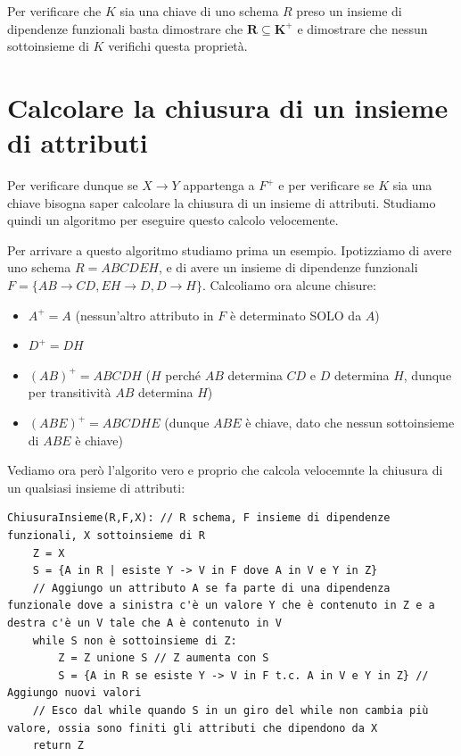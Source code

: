 \documentclass[11pt, a4paper, titlepage, oneside]{scrbook}
\begin{document}
\begin{Proposizione}
\label{propos-verificare-chiave}
Per verificare che $K$ sia una chiave di uno schema $R$ preso un insieme di dipendenze funzionali basta dimostrare che $\bm{R \subseteq K^+}$ e dimostrare che nessun sottoinsieme di $K$ verifichi questa proprietà.
\end{Proposizione} 

\section{Calcolare la chiusura di un insieme di attributi}

Per verificare dunque se $X \longrightarrow Y$ appartenga a $F^+$ e per verificare se $K$ sia una chiave bisogna saper calcolare la chiusura di un insieme di attributi. Studiamo quindi un algoritmo per eseguire questo calcolo velocemente.

Per arrivare a questo algoritmo studiamo prima un esempio. Ipotizziamo di avere uno schema $R = ABCDEH$, e di avere un insieme di dipendenze funzionali \mbox{$F = \{AB \longrightarrow CD, EH \longrightarrow D, D \longrightarrow H\}$}. Calcoliamo ora alcune chisure:
\begin{itemize}
    \item $A^+ = A$ (nessun'altro attributo in $F$ è determinato SOLO da $A$)
    \item $D^+ = DH$
    \item $(AB)^+ = ABCDH$ ($H$ perché $AB$ determina $CD$ e $D$ determina $H$, dunque per transitività $AB$ determina $H$)
    \item $(ABE)^+ = ABCDHE$ (dunque $ABE$ è chiave, dato che nessun sottoinsieme di $ABE$ è chiave)
\end{itemize} 

Vediamo ora però l'algorito vero e proprio che calcola velocemnte la chiusura di un qualsiasi insieme di attributi:
\begin{lstlisting}
ChiusuraInsieme(R,F,X): // R schema, F insieme di dipendenze funzionali, X sottoinsieme di R
    Z = X
    S = {A in R | esiste Y -> V in F dove A in V e Y in Z} 
    // Aggiungo un attributo A se fa parte di una dipendenza funzionale dove a sinistra c'è un valore Y che è contenuto in Z e a destra c'è un V tale che A è contenuto in V
    while S non è sottoinsieme di Z:
        Z = Z unione S // Z aumenta con S
        S = {A in R se esiste Y -> V in F t.c. A in V e Y in Z} // Aggiungo nuovi valori
    // Esco dal while quando S in un giro del while non cambia più valore, ossia sono finiti gli attributi che dipendono da X
    return Z
\end{lstlisting}
\end{document}
